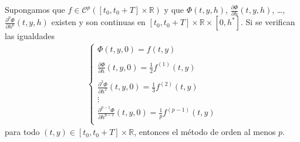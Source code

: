 \begin{teo}
    Supongamos que $f \in \mathcal{C}^p([t_0,t_0+T] \times \mathbb{R})$ y que $\Phi(t,y,h)$, $\frac{\partial \Phi}{\partial h}(t,y,h)$, \ldots, $\frac{\partial^p \Phi}{\partial h^p}(t,y,h)$ existen y son continuas en $[t_0,t_0+T] \times \mathbb{R} \times [0,h^*]$. Si se verifican las igualdades
    \begin{align*}
        \left\{ \begin{array}{lcc}
                    \Phi(t,y,0) = f(t,y)                                                            \\
                    \\ \frac{\partial \Phi}{\partial h}(t,y,0) =  \frac{1}{2}f^{(1)}(t,y) \\
                    \\  \frac{\partial^2 \Phi}{\partial h^2}(t,y,0) = \frac{1}{3}f^{(2)}(t,y) \\
                    \vdots                                                                          \\
                    \frac{\partial^{p-1} \Phi}{\partial h^{p-1}}(t,y,0) = \frac{1}{p}f^{(p-1)}(t,y) \\
                \end{array}
        \right.
    \end{align*}
    para todo $(t,y) \in [t_0,t_0+T] \times \mathbb{R}$, entonces el método de orden al menos $p$.
\end{teo}

